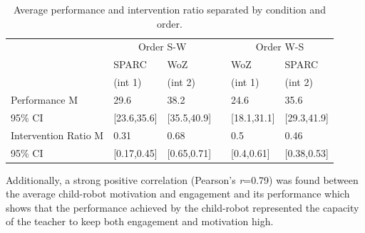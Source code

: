 \begin{table}[t]
	\caption{Average performance and intervention ratio separated by condition and order.}
	\centering
\begin{tabular}{@{}lllcll@{}}\toprule
	& \multicolumn{2}{c}{Order S-W} & \phantom{abc} & \multicolumn{2}{c}{Order W-S} \\
	\cmidrule{2-3} \cmidrule{5-6}
	& SPARC & WoZ && WoZ & SPARC \\
	& (int 1) & (int 2) && (int 1) & (int 2) \\
	\midrule			
Performance M & 29.6 & 38.2 && 24.6 & 35.6 \\
95\% CI & [23.6,35.6] & [35.5,40.9] && [18.1,31.1] & [29.3,41.9]\\[.2cm]
Intervention Ratio M & 0.31 & 0.68 && 0.5 & 0.46 \\
95\% CI & [0.17,0.45] & [0.65,0.71] && [0.4,0.61] & [0.38,0.53]\\
\bottomrule
\end{tabular}
\label{tab:woz_comp_means}
\end{table}


Additionally, a strong positive correlation (Pearson's \textit{r}=0.79) was found between the average child-robot motivation and engagement and its performance which shows that the performance achieved by the child-robot represented the capacity of the teacher to keep both engagement and motivation high.


